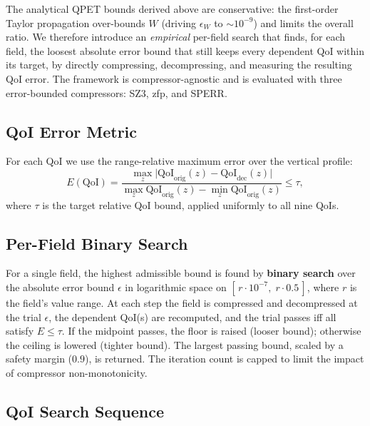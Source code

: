 \documentclass[11pt,a4paper]{article}
\begin{document}
The analytical QPET bounds derived above are conservative: the first-order
Taylor propagation over-bounds $W$ (driving $\epsilon_W$ to $\sim 10^{-9}$) and
limits the overall ratio. We therefore introduce an \emph{empirical} per-field
search that finds, for each field, the loosest absolute error bound that still
keeps every dependent QoI within its target, by directly compressing,
decompressing, and measuring the resulting QoI error. The framework is
compressor-agnostic and is evaluated with three error-bounded compressors:
SZ3, zfp, and SPERR.

\subsection{QoI Error Metric}

For each QoI we use the range-relative maximum error over the vertical profile:
\begin{equation}
  E(\text{QoI}) = \frac{\max_z \lvert \text{QoI}_{\text{orig}}(z) -
  \text{QoI}_{\text{dec}}(z)\rvert}{\max_z \text{QoI}_{\text{orig}}(z) -
  \min_z \text{QoI}_{\text{orig}}(z)} \le \tau,
\end{equation}
where $\tau$ is the target relative QoI bound, applied uniformly to all nine QoIs.

\subsection{Per-Field Binary Search}

For a single field, the highest admissible bound is found by \textbf{binary
search} over the absolute error bound $\epsilon$ in logarithmic space on
$[\,r\cdot 10^{-7},\; r\cdot 0.5\,]$, where $r$ is the field's value range. At
each step the field is compressed and decompressed at the trial $\epsilon$, the
dependent QoI(s) are recomputed, and the trial passes iff all satisfy
$E \le \tau$. If the midpoint passes, the floor is raised (looser bound);
otherwise the ceiling is lowered (tighter bound). The largest passing bound,
scaled by a safety margin ($0.9$), is returned. The iteration count is capped to
limit the impact of compressor non-monotonicity.

\subsection{QoI Search Sequence}
\end{document}
